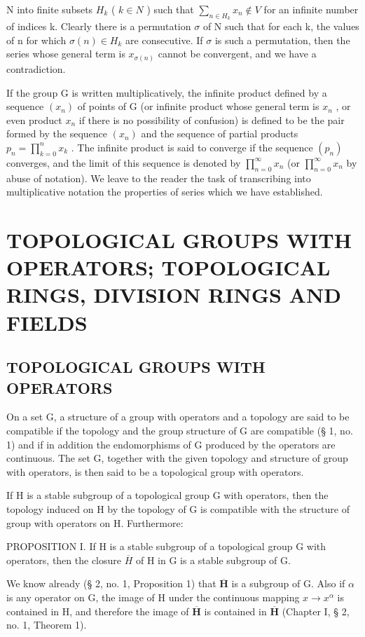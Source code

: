 N into finite subsets \(H_{k}\) ( \(k \in N\) ) such that \(\sum_{n \in H_{k}} x_{n} \notin V\) for an infinite number of indices k. Clearly there is a permutation \(\sigma\) of N such that for each k, the values of n for which \(\sigma(n) \in H_{k}\) are consecutive. If \(\sigma\) is such a permutation, then the series whose general term is \(x_{\sigma(n)}\) cannot be convergent, and we have a contradiction.

If the group G is written multiplicatively, the infinite product defined by a sequence \((x_{n})\) of points of G (or infinite product whose general term is \(x_{n}\) , or even product \(x_{n}\) if there is no possibility of confusion) is defined to be the pair formed by the sequence \((x_{n})\) and the sequence of partial products \(p_{n}=\prod_{k=0}^{n}x_{k}\) . The infinite product is said to converge if the sequence \((p_{n})\) converges, and the limit of this sequence is denoted by \(\prod_{n=0}^{\infty}x_{n}\) (or \(\prod_{n=0}^{\infty}x_{n}\) by abuse of notation). We leave to the reader the task of transcribing into multiplicative notation the properties of series which we have established.

\section{TOPOLOGICAL GROUPS WITH OPERATORS; TOPOLOGICAL RINGS, DIVISION RINGS AND FIELDS}

\subsection{TOPOLOGICAL GROUPS WITH OPERATORS}

On a set G, a structure of a group with operators and a topology are said to be compatible if the topology and the group structure of G are compatible (§ 1, no. 1) and if in addition the endomorphisms of G produced by the operators are continuous. The set G, together with the given topology and structure of group with operators, is then said to be a topological group with operators.

If H is a stable subgroup of a topological group G with operators, then the topology induced on H by the topology of G is compatible with the structure of group with operators on H. Furthermore:

PROPOSITION I. If H is a stable subgroup of a topological group G with operators, then the closure \(\overline{H}\) of H in G is a stable subgroup of G.

We know already (§ 2, no. 1, Proposition 1) that \(\overline{\mathbf{H}}\) is a subgroup of G. Also if \(\alpha\) is any operator on G, the image of H under the continuous mapping \(x \to x^{\alpha}\) is contained in H, and therefore the image of \(\overline{\mathbf{H}}\) is contained in \(\overline{\mathbf{H}}\) (Chapter I, § 2, no. 1, Theorem 1).

